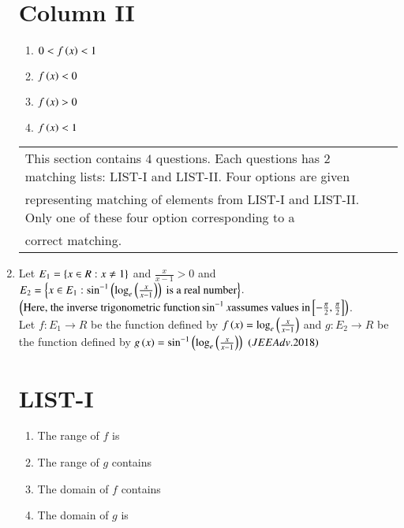 \documentclass[journal,12pt,onecolumn,article]{IEEEtran}
\theoremstyle{remark}
\begin{document}
\begin{enumerate}
\begin{multicols}{2}
						\section*{ Column II}
						\begin{enumerate}[label=(\alph*) ,start=16]
							\item $0<f\left(x\right)<1$
							\item $f\left(x\right)<0$
							\item $f\left(x\right)>0$
							\item $f\left(x\right)<1$
						\end{enumerate}
					\end{multicols}
         \begin{tabular}{l|l}
\\
\hline
This section contains $4$ questions. Each questions has $2$ matching lists: LIST-I and LIST-II. Four options are given\\representing matching of elements from LIST-I and LIST-II. Only one of these four option corresponding to a\\correct matching.
\\
\hline
        \end{tabular}
			 \item Let $E_1=\left\{x\in R:x\neq1\right\}$ and $\frac{x}{x-1}>0$ and 
				 $E_2=\left\{x\in E_1:\sin^{-1}\left(\log_e\left(\frac{x}{x-1}\right)\right)\text{ is a real number}\right\}$.\\
					$ \left(\text{Here, the inverse trigonometric function} \sin^{-1}x \text{assumes values in} {}\left[-\frac{\pi}{2},\frac{\pi}{2}\right]\right)$.\\
			
			Let $f:E_1\to R$ be the function defined by $f\left(x\right)=\log_e\left(\frac{x}{x-1}\right)$ and $g:E_2\to R$ be the function defined by $g\left(x\right)=\sin^{-1}\left(\log_e\left(\frac{x}{x-1}\right)\right)$
			\hfill${\left(JEE Adv.2018\right)}$
\begin{multicols}{2}
	\section*{LIST-I}
	\begin{enumerate}[label=(\Alph*), start=16]
	\item The range of $f$ is
	\item The range of $g$ contains
	\item The domain of $f$ contains
	\item The domain of $g$ is 
\end{enumerate}
\columnbreak

\end{multicols}
\end{enumerate}
\end{document}
